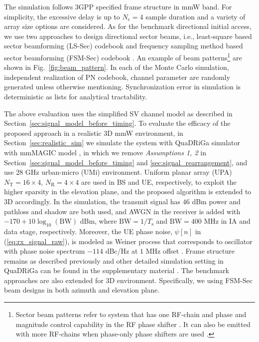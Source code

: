 \documentclass[journal]{IEEEtran}
\newcommand{\tx}[0]{\text{T}}
\newcommand{\rx}[0]{\text{R}}
\newcommand{\Ts}[0]{T_{\text{s}}}
\newcommand{\Nc}[0]{N_{\text{c}}}
\begin{document}
The simulation follows 3GPP specified frame structure in mmW band. For simplicity, the excessive delay is up to $\Nc=4$ sample duration and a variety of array size options are considered. As for the benchmark directional initial access, we use two approaches to design directional sector beams, i.e., least-square based sector beamforming (LS-Sec) codebook \cite{6847111} and frequency sampling method based sector beamforming (FSM-Sec) codebook \cite{array_textbook}. An example of beam patterns\footnote{Sector beam patterns refer to system that has one RF-chain and phase and magnitude control capability in the RF phase shifter \cite{7969017}. It can also be emitted with more RF-chains when phase-only phase shifters are used \cite{7885089}.} are shown in Fig.~\ref{fig:beam_pattern}. In each of the Monte Carlo simulation, independent realization of PN codebook, channel parameter are randomly generated unless otherwise mentioning. 
Synchronization error in simulation is deterministic as lists for analytical tractability. 

The above evaluation uses the simplified SV channel model as described in Section~\ref{sec:signal_model_before_timing}. To evaluate the efficacy of the proposed approach in a realistic 3D mmW environment, in Section~\ref{sec:realistic_sim} we simulate the system with QuaDRiGa simulator \cite{6758357} with mmMAGIC model \cite{mmMAGIC_model}, in which we remove \textit{Assumptions 1, 2} in Section~\ref{sec:signal_model_before_timing} and \ref{sec:signal_rearrangement}, and use $28$ GHz urban-micro (UMi) environment. Uniform planar array (UPA) $N_{\tx} = 16 \times 4$, $N_{\rx} = 4 \times 4$ are used in BS and UE, respectively, to exploit the higher sparsity in the elevation plane, and the proposed algorithm is extended to 3D accordingly. In the simulation, the transmit signal has $46$ dBm power and pathloss and shadow are both used, and AWGN in the receiver is added with $-170+10\log_{10}(\text{BW})$ dBm, where $\text{BW}=1/\Ts$ and $\text{BW} = 400$ MHz in IA and data stage, respectively. Moreover, the UE phase noise, $\psi[n]$ in (\ref{eq:rx_signal_raw}), is modeled as Weiner process \cite{847872} that corresponds to oscillator with phase noise spectrum $-114$ dBc/Hz at $1$ MHz offset \cite{PTRS_design,7508265}. Frame structure remains as described previously and other detailed simulation setting in QuaDRiGa can be found in the supplementary material \cite{hyan_git}. The benchmark approaches are also extended for 3D environment. Specifically, we using FSM-Sec beam designs in both azimuth and elevation plane.
\end{document}
